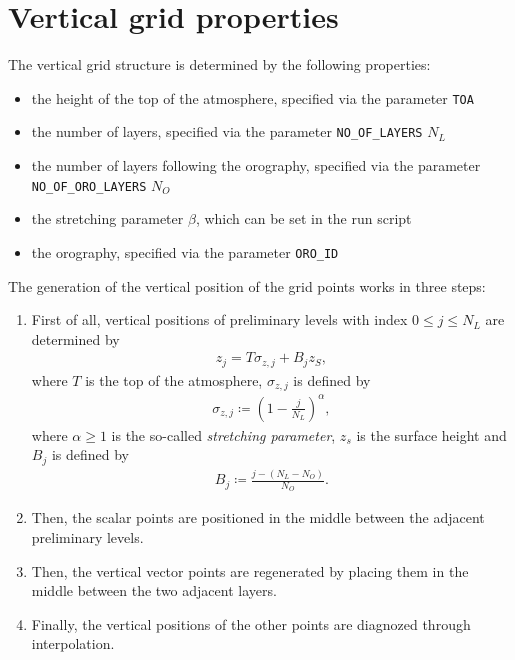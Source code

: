 \documentclass[10pt]{report}
\begin{document}
\section{Vertical grid properties}
\label{sec:vertical_grid_properties}

The vertical grid structure is determined by the following properties:

\begin{itemize}
\item the height of the top of the atmosphere, specified via the parameter \texttt{TOA}
\item the number of layers, specified via the parameter \texttt{NO\_OF\_LAYERS} $N_L$
\item the number of layers following the orography, specified via the parameter \texttt{NO\_OF\_ORO\_LAYERS} $N_O$
\item the stretching parameter $\beta$, which can be set in the run script
\item the orography, specified via the parameter \texttt{ORO\_ID}
\end{itemize}

The generation of the vertical position of the grid points works in three steps:
%
\begin{enumerate}
\item First of all, vertical positions of preliminary levels with index $0 \leq j \leq N_L$ are determined by
%
\begin{align}
z_j = T\sigma_{z, j} + B_jz_S,
\end{align}
%
where $T$ is the top of the atmosphere, $\sigma_{z, j}$ is defined by
%
\begin{align}
\sigma_{z, j} \coloneqq \left(1 - \frac{j}{N_L}\right)^\alpha,
\end{align}
%
where $\alpha \geq 1$ is the so-called \textit{stretching parameter}, $z_s$ is the surface height and $B_j$ is defined by
%
\begin{align}
B_j \coloneqq \frac{j - \left(N_L - N_O\right)}{N_O}.
\end{align}
%
\item Then, the scalar points are positioned in the middle between the adjacent preliminary levels.
\item Then, the vertical vector points are regenerated by placing them in the middle between the two adjacent layers.
\item Finally, the vertical positions of the other points are diagnozed through interpolation.
\end{enumerate}
\end{document}
